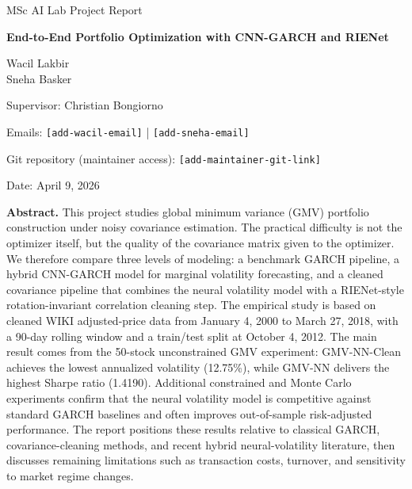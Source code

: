 \documentclass[11pt,a4paper]{article}
\begin{document}
\hypersetup{pageanchor=false}

\begin{titlepage}
\centering
{\Large MSc AI Lab Project Report\par}
\vspace{1.2cm}
{\huge\bfseries End-to-End Portfolio Optimization with CNN-GARCH and RIENet\par}
\vspace{1cm}
{\large Wacil Lakbir \\ Sneha Basker\par}
\vspace{0.6cm}
{\large Supervisor: Christian Bongiorno\par}
\vspace{0.4cm}
{\normalsize
Emails: \texttt{[add-wacil-email]} \quad | \quad \texttt{[add-sneha-email]}\par
}
\vspace{0.25cm}
{\normalsize Git repository (maintainer access): \texttt{[add-maintainer-git-link]}\par}
\vspace{0.25cm}
{\normalsize Date: April 9, 2026\par}
\vfill

\begin{minipage}{0.92\textwidth}
\textbf{Abstract.}
This project studies global minimum variance (GMV) portfolio construction under noisy covariance estimation. The practical difficulty is not the optimizer itself, but the quality of the covariance matrix given to the optimizer. We therefore compare three levels of modeling: a benchmark GARCH pipeline, a hybrid CNN-GARCH model for marginal volatility forecasting, and a cleaned covariance pipeline that combines the neural volatility model with a RIENet-style rotation-invariant correlation cleaning step. The empirical study is based on cleaned WIKI adjusted-price data from January 4, 2000 to March 27, 2018, with a 90-day rolling window and a train/test split at October 4, 2012. The main result comes from the 50-stock unconstrained GMV experiment: GMV-NN-Clean achieves the lowest annualized volatility (12.75\%), while GMV-NN delivers the highest Sharpe ratio (1.4190). Additional constrained and Monte Carlo experiments confirm that the neural volatility model is competitive against standard GARCH baselines and often improves out-of-sample risk-adjusted performance. The report positions these results relative to classical GARCH, covariance-cleaning methods, and recent hybrid neural-volatility literature, then discusses remaining limitations such as transaction costs, turnover, and sensitivity to market regime changes.
\end{minipage}
\vfill
\end{titlepage}
\clearpage
{}
\hypersetup{pageanchor=true}
\end{document}
